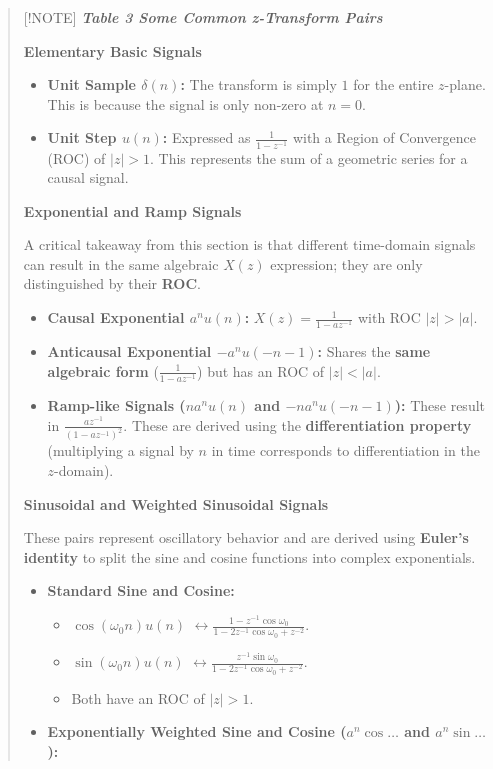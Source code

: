\begin{quote}
{[}!NOTE{]} \textbf{\emph{Table 3 Some Common z-Transform Pairs}}

\textbf{Elementary Basic Signals}

\begin{itemize}
\tightlist
\item
  \textbf{Unit Sample \(\delta(n)\):} The transform is simply \(1\) for
  the entire \(z\)-plane. This is because the signal is only non-zero at
  \(n=0\).
\item
  \textbf{Unit Step \(u(n)\):} Expressed as
  \textbf{\(\frac{1}{1-z^{-1}}\)} with a Region of Convergence (ROC) of
  \textbf{\(|z| > 1\)}. This represents the sum of a geometric series
  for a causal signal.
\end{itemize}

\textbf{Exponential and Ramp Signals}

A critical takeaway from this section is that different time-domain
signals can result in the same algebraic \(X(z)\) expression; they are
only distinguished by their \textbf{ROC}.

\begin{itemize}
\tightlist
\item
  \textbf{Causal Exponential \(a^n u(n)\):}
  \(X(z) = \frac{1}{1-az^{-1}}\) with ROC \textbf{\(|z| > |a|\)}.
\item
  \textbf{Anticausal Exponential \(-a^n u(-n-1)\):} Shares the
  \textbf{same algebraic form} (\(\frac{1}{1-az^{-1}}\)) but has an ROC
  of \textbf{\(|z| < |a|\)}.
\item
  \textbf{Ramp-like Signals (\(na^n u(n)\) and \(-na^n u(-n-1)\)):}
  These result in \textbf{\(\frac{az^{-1}}{(1-az^{-1})^2}\)}. These are
  derived using the \textbf{differentiation property} (multiplying a
  signal by \(n\) in time corresponds to differentiation in the
  \(z\)-domain).
\end{itemize}

\textbf{Sinusoidal and Weighted Sinusoidal Signals}

These pairs represent oscillatory behavior and are derived using
\textbf{Euler's identity} to split the sine and cosine functions into
complex exponentials.

\begin{itemize}
\tightlist
\item
  \textbf{Standard Sine and Cosine:}

  \begin{itemize}
  \tightlist
  \item
    \textbf{\(\cos(\omega_0 n)u(n)\)}
    \(\leftrightarrow \frac{1-z^{-1}\cos\omega_0}{1-2z^{-1}\cos\omega_0 + z^{-2}}\).
  \item
    \textbf{\(\sin(\omega_0 n)u(n)\)}
    \(\leftrightarrow \frac{z^{-1}\sin\omega_0}{1-2z^{-1}\cos\omega_0 + z^{-2}}\).
  \item
    Both have an ROC of \textbf{\(|z| > 1\)}.
  \end{itemize}
\item
  \textbf{Exponentially Weighted Sine and Cosine (\(a^n \cos\dots\) and
  \(a^n \sin\dots\)):}


\end{itemize}
\end{quote}
